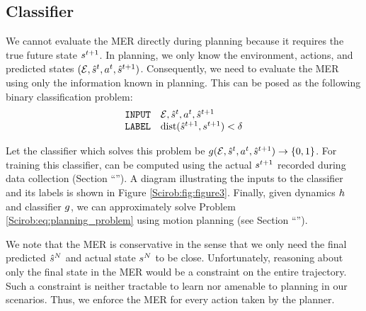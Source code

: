 \subsection{Classifier}

We cannot evaluate the MER directly during planning because it requires the true future state $s^{t+1}$.
In planning, we only know the environment, actions, and predicted states $(\mathcal{E},\hat{s}^{t},a^{t},\hat{s}^{t+1})$. Consequently, we need to evaluate the MER using only the information known in planning. This can be posed as the following binary classification problem:
\begin{equation}
  \begin{array}{rl}
    \texttt{INPUT} & \mathcal{E},\hat{s}^{t},a^{t},\hat{s}^{t+1} \\
    \texttt{LABEL} & \mathrm{dist}(\hat{s}^{t+1},s^{t+1}) < \delta \\
  \end{array}
  \label{Scirob:eq:strict_mer_classification_problem}
\end{equation}

Let the classifier which solves this problem be $g(\mathcal{E}, \hat{s}^{t},a^{t},\hat{s}^{t+1}) \rightarrow \{0,1\}$. For training this classifier, \classifierLabel can be computed using the actual $s^{t+1}$ recorded during data collection (Section ``''). A diagram illustrating the inputs to the classifier and its labels is shown in Figure \ref{Scirob:fig:figure3}. Finally, given dynamics $h$ and classifier $g$, we can approximately solve Problem \eqref{Scirob:eq:planning_problem} using motion planning (see Section ``'').

We note that the MER is conservative in the sense that we only need the final predicted $\hat{s}^{N}$ and actual state $s^{N}$ to be close. Unfortunately, reasoning about only the final state in the MER would be a constraint on the entire trajectory. Such a constraint is neither tractable to learn nor amenable to planning in our scenarios. Thus, we enforce the MER for every action taken by the planner.

